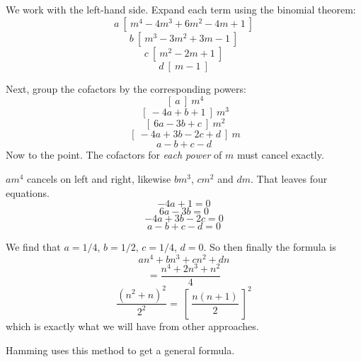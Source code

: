 \documentclass[11pt, oneside]{article}
\begin{document}
We work with the left-hand side.  Expand each term using the binomial theorem:
\[ a \ [ \ m^4 - 4m^3 + 6m^2 - 4m + 1 \ ]  \]
\[ b \ [ \ m^3 - 3m^2 + 3m -1 \ ]  \]
\[ c \ [ \ m^2 - 2m + 1 \ ]  \]
\[ d \ [ \ m - 1 \ ]  \] 

Next, group the cofactors by the corresponding powers:
\[  \ [ \ a \ ] \ m^4 \]
\[  \ [ \ -4a + b + 1 \ ] \ m^3 \]
\[  \ [ \ 6a - 3b + c \ ] \ m^2 \]
\[  \ [ \ -4a + 3b - 2c + d \ ] \ m \]
\[ a - b + c - d \]
Now to the point.  The cofactors for \emph{each power} of $m$ must cancel exactly.

$am^4$ cancels on left and right, likewise $bm^3$, $cm^2$ and $dm$.  That leaves four equations.
\[ -4a + 1 = 0 \]
\[ 6a - 3b = 0 \]
\[ -4a + 3b - 2c = 0 \]
\[ a - b + c - d = 0 \]

We find that $a = 1/4$, $b = 1/2$, $c = 1/4$, $d = 0$.  So then finally the formula is
\[ an^4 + bn^3 + cn^2 + dn \]
\[ = \frac{n^4 + 2n^3 + n^2}{4} \]
\[ \frac{(n^2 + n)^2}{2^2} = \ [ \ \frac{n(n+1)}{2} \ ]^2 \]
which is exactly what we will have from other approaches.

Hamming uses this method to get a general formula.
\end{document}
